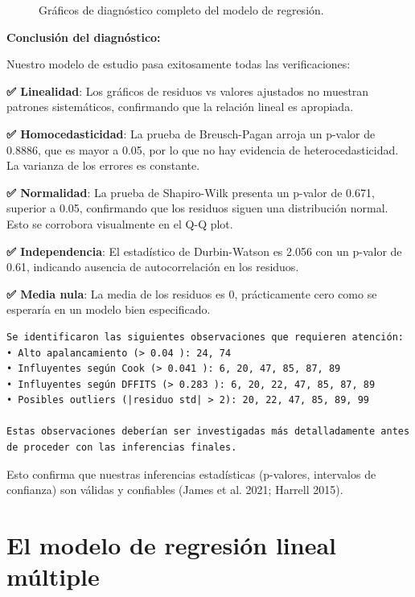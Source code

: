 \documentclass[
  letterpaper,
  DIV=11,
  numbers=noendperiod]{scrreprt}
\begin{document}
\begin{tcolorbox}
\begin{figure}[H]
{}

\caption{\label{fig-diagnostico-completo}Gráficos de diagnóstico
completo del modelo de regresión.}

\end{figure}%

\textbf{Conclusión del diagnóstico:}

Nuestro modelo de estudio pasa exitosamente todas las verificaciones:

\textbf{✅ Linealidad}: Los gráficos de residuos vs valores ajustados no
muestran patrones sistemáticos, confirmando que la relación lineal es
apropiada.

\textbf{✅ Homocedasticidad}: La prueba de Breusch-Pagan arroja un
p-valor de 0.8886, que es mayor a 0.05, por lo que no hay evidencia de
heterocedasticidad. La varianza de los errores es constante.

\textbf{✅ Normalidad}: La prueba de Shapiro-Wilk presenta un p-valor de
0.671, superior a 0.05, confirmando que los residuos siguen una
distribución normal. Esto se corrobora visualmente en el Q-Q plot.

\textbf{✅ Independencia}: El estadístico de Durbin-Watson es 2.056 con
un p-valor de 0.61, indicando ausencia de autocorrelación en los
residuos.

\textbf{✅ Media nula}: La media de los residuos es 0, prácticamente
cero como se esperaría en un modelo bien especificado.

\begin{verbatim}
Se identificaron las siguientes observaciones que requieren atención:
• Alto apalancamiento (> 0.04 ): 24, 74
• Influyentes según Cook (> 0.041 ): 6, 20, 47, 85, 87, 89
• Influyentes según DFFITS (> 0.283 ): 6, 20, 22, 47, 85, 87, 89
• Posibles outliers (|residuo std| > 2): 20, 22, 47, 85, 89, 99

Estas observaciones deberían ser investigadas más detalladamente antes de proceder con las inferencias finales.
\end{verbatim}

Esto confirma que nuestras inferencias estadísticas (p-valores,
intervalos de confianza) son válidas y confiables (James et al. 2021;
Harrell 2015).

\end{tcolorbox}


\chapter{El modelo de regresión lineal
múltiple}\label{sec-regresion-lineal-multiple}
\end{document}
